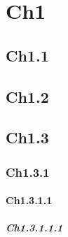\chapter{Ch1}
\label{chap:Ch1}

\section{Ch1.1}\label{section:Ch1.1}
\blindtext

\section{Ch1.2}\label{section:Ch1.2}
\blindtext \cite{test1}

\section{Ch1.3}\label{section:Ch1.3}
\blindtext\citep{test2}

\subsection{Ch1.3.1}\label{section:Ch1.3.1}
\blindtext\citet{test1}

\subsubsection{Ch1.3.1.1}
\blindtext

\paragraph{Ch1.3.1.1.1}\mbox{} \\
\blindtext

